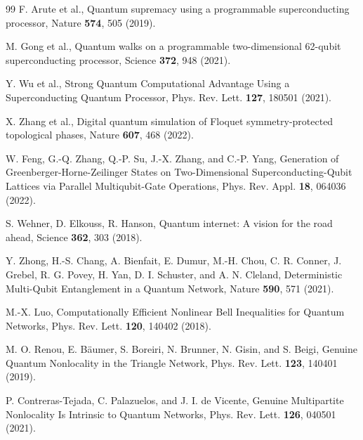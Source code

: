 \documentclass[pra,aps,twocolumn,showpacs]{revtex4}
\begin{document}
\begin{thebibliography}{99}
 F. Arute et al., Quantum supremacy using a programmable superconducting processor, Nature \textbf{574}, 505 (2019).

 M. Gong et al., Quantum walks on a programmable two-dimensional 62-qubit superconducting processor, Science \textbf{372}, 948 (2021).

 Y. Wu et al., Strong Quantum Computational Advantage Using a Superconducting Quantum Processor, Phys. Rev. Lett. \textbf{127}, 180501 (2021).

 X. Zhang et al., Digital quantum simulation of Floquet symmetry-protected topological phases, Nature \textbf{607}, 468 (2022).

 W. Feng, G.-Q. Zhang, Q.-P. Su, J.-X. Zhang, and C.-P. Yang, Generation of Greenberger-Horne-Zeilinger States on Two-Dimensional Superconducting-Qubit Lattices via Parallel Multiqubit-Gate Operations, Phys. Rev. Appl. \textbf{18}, 064036 (2022).

 S. Wehner, D. Elkouss, R. Hanson, Quantum internet: A vision for the road ahead, Science \textbf{362}, 303 (2018).

 Y. Zhong, H.-S. Chang, A. Bienfait, E. Dumur, M.-H. Chou, C. R. Conner, J. Grebel, R. G. Povey, H. Yan, D. I. Schuster, and A. N. Cleland, Deterministic Multi-Qubit Entanglement in a Quantum Network, Nature \textbf{590}, 571 (2021).

  M.-X. Luo, Computationally Efficient Nonlinear Bell Inequalities for Quantum Networks, Phys. Rev. Lett. \textbf{120}, 140402 (2018).

   M. O. Renou, E. B\"{a}umer, S. Boreiri, N. Brunner, N. Gisin, and S. Beigi, Genuine Quantum Nonlocality in the Triangle Network, Phys. Rev. Lett. \textbf{123}, 140401 (2019).

 P. Contreras-Tejada, C. Palazuelos, and J. I. de Vicente, Genuine Multipartite Nonlocality Is Intrinsic to Quantum Networks, Phys. Rev. Lett. \textbf{126}, 040501 (2021).




\end{thebibliography}
\end{document}
